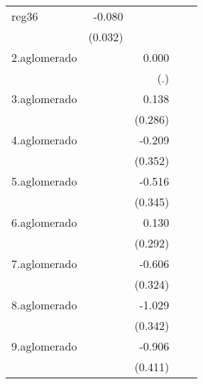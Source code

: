 {\begin{longtable}{l*{4}{D{.}{.}{-1}}}
\addlinespace
reg36       &      -0.080\sym{*}  &                     &                     &                     \\
            &     (0.032)         &                     &                     &                     \\
\addlinespace
2.aglomerado&                     &       0.000         &                     &                     \\
            &                     &         (.)         &                     &                     \\
\addlinespace
3.aglomerado&                     &       0.138         &                     &                     \\
            &                     &     (0.286)         &                     &                     \\
\addlinespace
4.aglomerado&                     &      -0.209         &                     &                     \\
            &                     &     (0.352)         &                     &                     \\
\addlinespace
5.aglomerado&                     &      -0.516         &                     &                     \\
            &                     &     (0.345)         &                     &                     \\
\addlinespace
6.aglomerado&                     &       0.130         &                     &                     \\
            &                     &     (0.292)         &                     &                     \\
\addlinespace
7.aglomerado&                     &      -0.606         &                     &                     \\
            &                     &     (0.324)         &                     &                     \\
\addlinespace
8.aglomerado&                     &      -1.029\sym{**} &                     &                     \\
            &                     &     (0.342)         &                     &                     \\
\addlinespace
9.aglomerado&                     &      -0.906\sym{*}  &                     &                     \\
            &                     &     (0.411)         &                     &                     \\

\end{longtable}}
